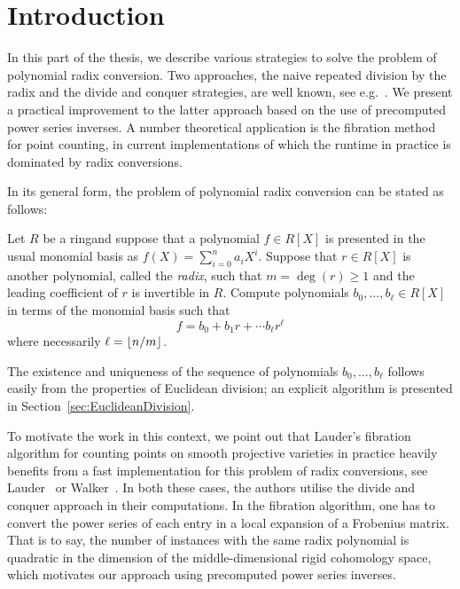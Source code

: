 
\chapter{Introduction}
\label{ch:02-Intro}

In this part of the thesis, we describe various strategies to solve the 
problem of polynomial radix conversion.  Two approaches, the naive 
repeated division by the radix and the divide and conquer strategies, are 
well known, see e.g.~\citep[\S 9.2]{GathenGerhard2003}.  We present a 
practical improvement to the latter approach based on the use of 
precomputed power series inverses.  A number theoretical application is 
the fibration method for point counting, in current implementations of 
which the runtime in practice is dominated by radix conversions.

In its general form, the problem of polynomial radix conversion 
can be stated as follows:

\begin{prob} \label{prob:exact}
Let $R$ be a ring\footnotemark and suppose that a polynomial $f \in R[X]$ is 
presented in the usual monomial basis as $f(X) = \sum_{i=0}^{n} a_i X^i$.
Suppose that $r \in R[X]$ is another polynomial, called the \emph{radix}, 
such that $m = \deg(r) \geq 1$ and the leading coefficient of $r$ is invertible 
in $R$.  Compute polynomials $b_0, \dotsc, b_{\ell} \in R[X]$ in terms of 
the monomial basis such that 
\begin{equation*}
f = b_0 + b_1 r + \dotsb b_{\ell} r^{\ell}
\end{equation*}
where necessarily $\ell = \left\lfloor n / m\right\rfloor$.
\end{prob}


The existence and uniqueness of the sequence of polynomials $b_0, \dotsc, b_{\ell}$ 
follows easily from the properties of Euclidean division;  an explicit algorithm is 
presented in Section~\ref{sec:EuclideanDivision}.

To motivate the work in this context, we point out that Lauder's 
fibration algorithm for counting points on smooth projective varieties 
in practice heavily benefits from a fast implementation for this problem 
of radix conversions, see Lauder~\citep[\S 6.5.2]{Lauder2006} or 
Walker~\citep[\S 3.2.2]{Walker2009}.  In both these cases, the authors 
utilise the divide and conquer approach in their computations.  In the 
fibration algorithm, one has to convert the power series of each 
entry in a local expansion of a Frobenius matrix.  That is to say, 
the number of instances with the same radix polynomial is quadratic 
in the dimension of the middle-dimensional rigid cohomology space, 
which motivates our approach using precomputed power series inverses.

